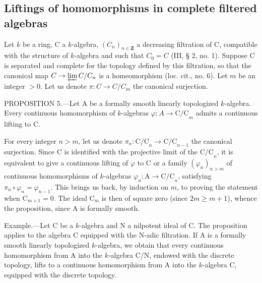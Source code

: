 \subsection{Liftings of homomorphisms in complete filtered algebras}

Let \(k\) be a ring, C a \(k\)-algebra, \((C_n)_{n \in \mathbf{Z}}\) a decreasing filtration of C, compatible with the structure of \(k\)-algebra and such that \(C_0 = C\) (III, § 2, no. 1). Suppose C is separated and complete for the topology defined by this filtration, so that the canonical map \(C \to \varprojlim C / C_n\) is a homeomorphism (loc. cit., no. 6). Let \(m\) be an integer \(>0\). Let us denote \(\pi: C \to C / C_m\) the canonical surjection.

PROPOSITION 5.—Let A be a formally smooth linearly topologized \(k\)-algebra. Every continuous homomorphism of \(k\)-algebras \(\varphi: A \to \mathrm{C/C}_{m}\) admits a continuous lifting to C.

For every integer \(n > m\), let us denote \(\pi_n: \mathrm{C/C}_n \to \mathrm{C/C}_{n-1}\) the canonical surjection. Since C is identified with the projective limit of the \(\mathrm{C/C}_n\), it is equivalent to give a continuous lifting of \(\varphi\) to C or a family \((\varphi_n)_{n > m}\) of continuous homomorphisms of \(k\)-algebras \(\varphi_n: \mathrm{A} \to \mathrm{C/C}_n\), satisfying \(\pi_n \circ \varphi_n = \varphi_{n-1}\). This brings us back, by induction on \(m\), to proving the statement when \(\mathrm{C}_{m+1} = 0\). The ideal \(\mathrm{C}_m\) is then of square zero (since \(2m \geqslant m+1\)), whence the proposition, since A is formally smooth.

Example.—Let C be a \(k\)-algebra and N a nilpotent ideal of C. The proposition applies to the algebra C equipped with the N-adic filtration. If A is a formally smooth linearly topologized \(k\)-algebra, we obtain that every continuous homomorphism from A into the \(k\)-algebra C/N, endowed with the discrete topology, lifts to a continuous homomorphism from A into the \(k\)-algebra C, equipped with the discrete topology.

